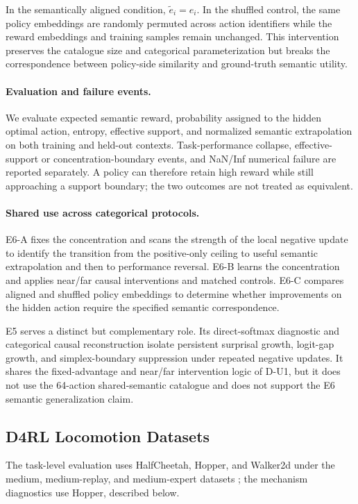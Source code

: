 \documentclass[sigconf,anonymous,review]{acmart}
\theoremstyle{acmdefinition}
\begin{document}
In the semantically aligned condition,
$\widetilde e_i=e_i$.
In the shuffled control, the same policy embeddings are randomly
permuted across action identifiers while the reward embeddings and
training samples remain unchanged. This intervention preserves the
catalogue size and categorical parameterization but breaks the
correspondence between policy-side similarity and ground-truth semantic
utility.

\paragraph{Evaluation and failure events.}
We evaluate expected semantic reward, probability assigned to the hidden
optimal action, entropy, effective support, and normalized semantic
extrapolation on both training and held-out contexts. Task-performance
collapse, effective-support or concentration-boundary events, and
NaN/Inf numerical failure are reported separately. A policy can
therefore retain high reward while still approaching a support boundary;
the two outcomes are not treated as equivalent.

\paragraph{Shared use across categorical protocols.}
E6-A fixes the concentration and scans the strength of the local
negative update to identify the transition from the positive-only
ceiling to useful semantic extrapolation and then to performance
reversal. E6-B learns the concentration and applies near/far causal
interventions and matched controls. E6-C compares aligned and shuffled
policy embeddings to determine whether improvements on the hidden action
require the specified semantic correspondence.

E5 serves a distinct but complementary role. Its direct-softmax
diagnostic and categorical causal reconstruction isolate persistent
surprisal growth, logit-gap growth, and simplex-boundary suppression
under repeated negative updates. It shares the fixed-advantage and
near/far intervention logic of D-U1, but it does not use the 64-action
shared-semantic catalogue and does not support the E6 semantic
generalization claim.

\subsection{D4RL Locomotion Datasets}
\label{app:hopper_datasets}

The task-level evaluation uses HalfCheetah, Hopper, and Walker2d under
the medium, medium-replay, and medium-expert datasets
\citep{fu2020d4rl}; the mechanism diagnostics use Hopper, described
below.
\end{document}
